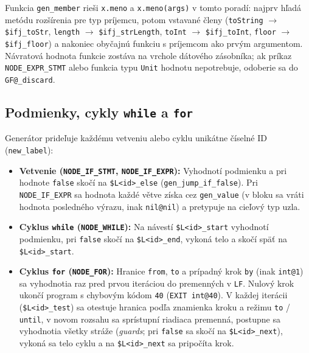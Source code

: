 Funkcia \texttt{gen\_member} rieši \texttt{x.meno} a \texttt{x.meno(args)} v tomto poradí: najprv hľadá metódu rozšírenia pre typ príjemcu, potom vstavané členy (\texttt{toString} $\rightarrow$ \texttt{\$ifj\_toStr}, \texttt{length} $\rightarrow$ \texttt{\$ifj\_strLength}, \texttt{toInt} $\rightarrow$ \texttt{\$ifj\_toInt}, \texttt{floor} $\rightarrow$ \texttt{\$ifj\_floor}) a nakoniec obyčajnú funkciu s príjemcom ako prvým argumentom. Návratová hodnota funkcie zostáva na vrchole dátového zásobníka; ak príkaz \texttt{NODE\_EXPR\_STMT} alebo funkcia typu \texttt{Unit} hodnotu nepotrebuje, odoberie sa do \texttt{GF@\_discard}.

\subsection{Podmienky, cykly \texttt{while} a \texttt{for}}
Generátor prideľuje každému vetveniu alebo cyklu unikátne číselné ID (\texttt{new\_label}):
\begin{itemize}
    \item \textbf{Vetvenie (\texttt{NODE\_IF\_STMT}, \texttt{NODE\_IF\_EXPR}):} Vyhodnotí podmienku a pri hodnote \texttt{false} skočí na \texttt{\$L<id>\_else} (\texttt{gen\_jump\_if\_false}). Pri \texttt{NODE\_IF\_EXPR} sa hodnota každé větve získa cez \texttt{gen\_value} (v bloku sa vráti hodnota posledného výrazu, inak \texttt{nil@nil}) a pretypuje na cieľový typ uzla.
    \item \textbf{Cyklus \texttt{while} (\texttt{NODE\_WHILE}):} Na návestí \texttt{\$L<id>\_start} vyhodnotí podmienku, pri \texttt{false} skočí na \texttt{\$L<id>\_end}, vykoná telo a skočí späť na \texttt{\$L<id>\_start}.
    \item \textbf{Cyklus \texttt{for} (\texttt{NODE\_FOR}):} Hranice \texttt{from}, \texttt{to} a prípadný krok \texttt{by} (inak \texttt{int@1}) sa vyhodnotia raz pred prvou iteráciou do premenných v \texttt{LF}. Nulový krok ukončí program s chybovým kódom \texttt{40} (\texttt{EXIT int@40}). V každej iterácii (\texttt{\$L<id>\_test}) sa otestuje hranica podľa znamienka kroku a režimu \texttt{to} / \texttt{until}, v novom rozsahu sa sprístupní riadiaca premenná, postupne sa vyhodnotia všetky stráže (\emph{guards}; pri \texttt{false} sa skočí na \texttt{\$L<id>\_next}), vykoná sa telo cyklu a na \texttt{\$L<id>\_next} sa pripočíta krok.
\end{itemize}

